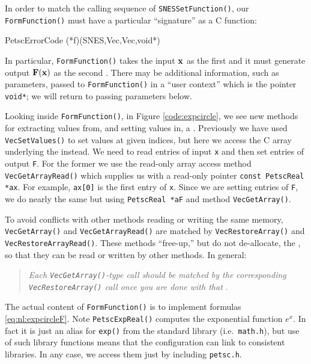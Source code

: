 In order to match the calling sequence of \texttt{SNESSetFunction()}, our \texttt{FormFunction()} must have a particular ``signature'' as a C function:
\begin{code}
PetscErrorCode (*f)(SNES,Vec,Vec,void*)
\end{code}
In particular, \texttt{FormFunction()} takes the input $\mathbf{x}$ as the first \pVec and it must generate output $\mathbf{F}(\mathbf{x})$ as the second \pVec.  There may be additional information, such as parameters, passed to \texttt{FormFunction()} in a ``user context'' which is the pointer \texttt{void*}; we will return to passing parameters below.

Looking inside \texttt{FormFunction()}, in Figure \ref{code:expcircle}, we see new methods for extracting values from, and setting values in, a \pVec.  Previously we have used \texttt{VecSetValues()} to set values at given indices, but here we access the C array underlying the \pVec instead.  We need to read entries of input \pVec \texttt{x} and then set entries of output \pVec \texttt{F}.  For the former we use the read-only array access method \texttt{VecGetArrayRead()} which supplies us with a read-only pointer \texttt{const PetscReal *ax}.  For example, \texttt{ax[0]} is the first entry of \pVec \texttt{x}.  Since we are setting entries of \pVec \texttt{F}, we do nearly the same but using \texttt{PetscReal *aF} and method \texttt{VecGetArray()}.

To avoid conflicts with other methods reading or writing the same memory, \texttt{VecGetArray()} and \texttt{VecGetArrayRead()} are matched by \texttt{VecRestoreArray()} and \texttt{VecRestoreArrayRead()}.  These methods ``free-up,'' but do not de-allocate, the \pVecs, so that they can be read or written by other methods.  In general:
\begin{quote}
\emph{Each \emph{\texttt{VecGetArray()}}-type call should be matched by the corresponding \emph{\texttt{VecRestoreArray()}} call once you are done with that \emph{\pVec}}.
\end{quote}

The actual content of \texttt{FormFunction()} is to implement formulas \eqref{eq:nl:expcircleF}.  Note \texttt{PetscExpReal()} computes the exponential function $e^x$.  In fact it is just an alias for \texttt{exp()} from the standard library (i.e.~\texttt{math.h}), but use of such \PETSc library functions means that the \PETSc configuration can link to consistent libraries.  In any case, we access them just by including \texttt{petsc.h}.

